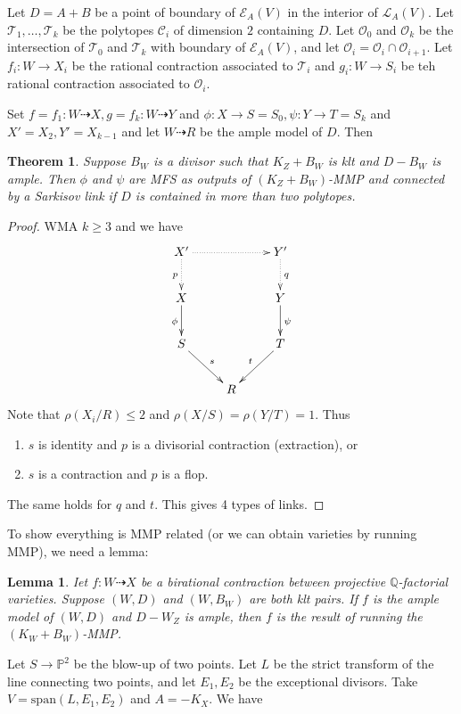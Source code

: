 \documentclass{article}
\newtheorem{lem}[defn]{Lemma}
\newtheorem{thm}[defn]{Theorem}
\begin{document}
Let $ D=A+B $ be a point of boundary of $ \mathcal{E}_A(V) $ in the interior of $ \mathcal{L}_A(V) $. Let $ \mathcal{T}_1, \ldots, \mathcal{T}_k $ be the polytopes $ \mathcal{C}_i $ of dimension $ 2 $ containing $ D $. Let $ \mathcal{O}_0 $ and $ \mathcal{O}_k $ be the intersection of $ \mathcal{T}_0 $ and $ \mathcal{T}_k $ with boundary of $ \mathcal{E}_A(V) $, and let $ \mathcal{O}_i=\mathcal{O}_i\cap\mathcal{O}_{i+1} $. Let $ f_i:W\to X_i $ be the rational contraction associated to $ \mathcal{T}_i $ and $ g_i:W\to S_i $ be teh rational contraction associated to $ \mathcal{O}_i $.

Set $ f=f_1:W\dashrightarrow X, g=f_k:W\dashrightarrow Y $ and $ \phi:X\to S=S_0,\psi:Y\to T=S_k $ and $ X'=X_2,Y'=X_{k-1} $ and let $ W\dashrightarrow R $ be the ample model of $ D $. Then
\begin{thm}
Suppose $ B_W $ is a divisor such that $ K_Z+B_W $ is klt and $ D-B_W $ is ample. Then $ \phi $ and $ \psi $ are MFS as outputs of $ (K_Z+B_W) $-MMP and connected by a Sarkisov link if $ D $ is contained in more than two polytopes.
\end{thm}

\begin{proof}
WMA $ k\geqslant 3 $ and we have
$$ \xymatrix{
X'\ar@{.>}[d]_p\ar@{.>}[rr]&&Y'\ar@{.>}[d]^q\\
X\ar[d]_{\phi}&&Y\ar[d]^\psi\\
S\ar[rd]^s&&T\ar[ld]_t\\
&R&} $$
Note that $ \rho(X_i/R)\leqslant 2 $ and $ \rho(X/S)=\rho(Y/T)=1 $. Thus
\begin{enumerate}
\item $ s $ is identity and $ p $ is a divisorial contraction (extraction), or
\item $ s $ is a contraction and $ p $ is a flop.
\end{enumerate}
The same holds for $ q $ and $ t $. This gives 4 types of links.
\end{proof}
To show everything is MMP related (or we can obtain varieties by running MMP), we need a lemma:
\begin{lem}
Iet $ f:W\dashrightarrow X $ be a birational contraction between projective $ \mathbb{Q} $-factorial varieties. Suppose $ (W,D) $ and $ (W,B_W) $ are both klt pairs. If $ f $ is the ample model of $ (W,D) $ and $ D-W_Z $ is ample, then $ f $ is the result of running the $ (K_W+B_W) $-MMP.
\end{lem}
Let $ S\to \mathbb{P}^2 $ be the blow-up of two points. Let $ L $ be the strict transform of the line connecting two points, and let $ E_1 ,E_2$ be the exceptional divisors. Take $ V=\mathrm{span}(L,E_1,E_2) $ and $ A=-K_X $. We have
\end{document}
